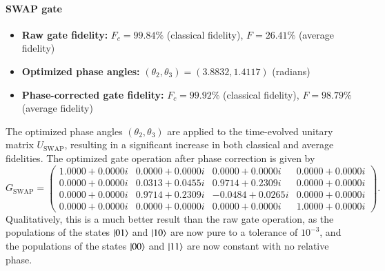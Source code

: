 \documentclass{subfiles}
\begin{document}
\paragraph{SWAP gate}
\begin{itemize}
    \item \textbf{Raw gate fidelity:} $F_c = 99.84\%$ (classical fidelity), $F = 26.41\%$ (average fidelity)
    \item \textbf{Optimized phase angles:} $(\theta_2, \theta_3) = (3.8832, 1.4117)$ (radians)
    \item \textbf{Phase-corrected gate fidelity:} $F_c = 99.92\%$ (classical fidelity), $F = 98.79\%$ (average fidelity)
\end{itemize}
The optimized phase angles $(\theta_2, \theta_3)$ are applied to the time-evolved unitary matrix $U_{\text{SWAP}}$, resulting in a significant increase in both classical and average fidelities. 
The optimized gate operation after phase correction is given by
\begin{equation}
G_{\mathrm{SWAP}}
=
\begin{pmatrix}
 1.0000 + 0.0000i & 0.0000 + 0.0000i & 0.0000 + 0.0000i & 0.0000 + 0.0000i\\
 0.0000 + 0.0000i & 0.0313 + 0.0455i & 0.9714 + 0.2309i & 0.0000 + 0.0000i\\
 0.0000 + 0.0000i & 0.9714 + 0.2309i & -0.0484 + 0.0265i & 0.0000 + 0.0000i\\
 0.0000 + 0.0000i & 0.0000 + 0.0000i & 0.0000 + 0.0000i & 1.0000 + 0.0000i
\end{pmatrix}.
\end{equation}
Qualitatively, this is a much better result than the raw gate operation, as the populations of the states $\ket{01}$ and $\ket{10}$ are now pure to a tolerance of $10^{-3}$, and the populations of the states $\ket{00}$ and $\ket{11}$ are now constant with no relative phase. 
\end{document}

